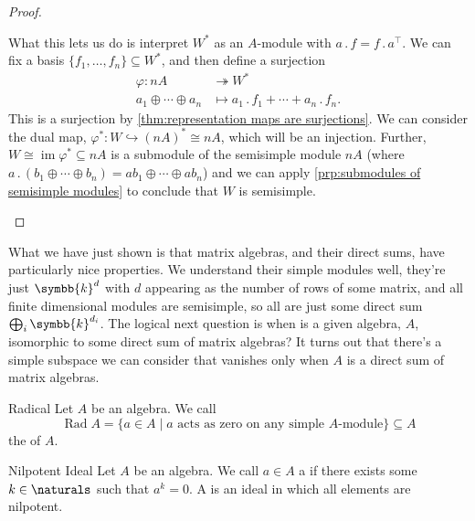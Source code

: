 \documentclass[fleqn]{NotesClass}
\renewcommand{\field}{\symbb{k}}
\newcommand{\action}{\mathbin{.}}
\DeclareMathOperator{\im}{im}
\newcommand{\isomorphic}{\cong}
\newcommand{\trans}{\top}
\DeclareMathOperator{\Rad}{Rad}
\begin{document}
\begin{thm}{}{}
\begin{proof}
\begin{enumerate}
                What this lets us do is interpret \(W^*\) as an \(A\)-module with \(a \action f = f \action a^{\trans}\).
                We can fix a basis \(\{f_1, \dotsc, f_n\} \subseteq W^*\), and then define a surjection
                \begin{align}
                    \varphi \colon nA &\twoheadrightarrow W^*\\
                    a_1 \oplus \dotsb \oplus a_n &\mapsto a_1 \action f_1 + \dotsb + a_n \action f_n.
                \end{align}
                This is a surjection by \cref{thm:representation maps are surjections}.
                We can consider the dual map, \(\varphi^* \colon W \hookrightarrow (nA)^* \isomorphic nA\), which will be an injection.
                Further, \(W \isomorphic \im \varphi^* \subseteq nA\) is a submodule of the semisimple module \(nA\) (where \(a \action (b_1 \oplus \dotsb \oplus b_n) = ab_1 \oplus \dotsb \oplus ab_n\)) and we can apply \cref{prp:submodules of semisimple modules} to conclude that \(W\) is semisimple.
            \end{enumerate}
        \end{proof}
    \end{thm}
    
    What we have just shown is that matrix algebras, and their direct sums, have particularly nice properties.
    We understand their simple modules well, they're just \(\field^{d}\) with \(d\) appearing as the number of rows of some matrix, and all finite dimensional modules are semisimple, so all are just some direct sum \(\bigoplus_i \field^{d_i}\).
    The logical next question is when is a given algebra, \(A\), isomorphic to some direct sum of matrix algebras?
    It turns out that there's a simple subspace we can consider that vanishes only when \(A\) is a direct sum of matrix algebras.
    
    \begin{dfn}{Radical}{}
        Let \(A\) be an algebra.
        We call
        \begin{equation}
            \Rad A = \{a \in A \mid a \text{ acts as zero on any simple } A \text{-module}\} \subseteq A
        \end{equation}
        the  of \(A\).
    \end{dfn}
    
    \begin{dfn}{Nilpotent Ideal}{}
        Let \(A\) be an algebra.
        We call \(a \in A\) a  if there exists some \(k \in \naturals\) such that \(a^k = 0\).
        A  is an ideal in which all elements are nilpotent.
    \end{dfn}
    
\end{document}
